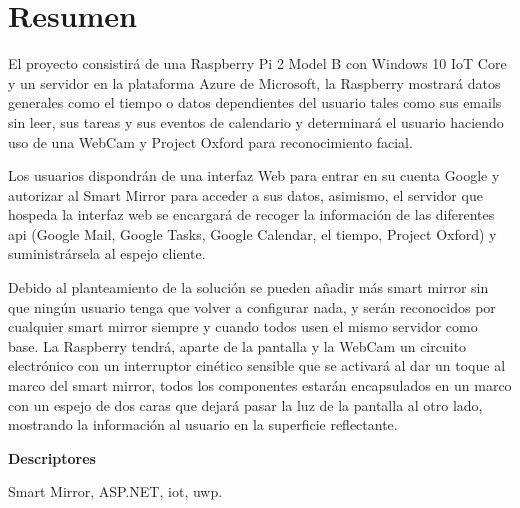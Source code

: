 \chapter*{Resumen}

El proyecto consistirá de una Raspberry Pi 2 Model B con Windows 10 IoT Core y un servidor en la plataforma Azure de Microsoft, la Raspberry mostrará datos generales como el tiempo o datos dependientes del usuario tales como sus emails sin leer, sus tareas y sus eventos de calendario y determinará el usuario haciendo uso de una WebCam y Project Oxford para reconocimiento facial.

Los usuarios dispondrán de una interfaz Web para entrar en su cuenta Google y autorizar al Smart Mirror para acceder a sus datos, asimismo, el servidor que hospeda la interfaz web se encargará de recoger la información de las diferentes \acrshort{api} (Google Mail, Google Tasks, Google Calendar, el tiempo, Project Oxford) y suministrársela al espejo cliente.

Debido al planteamiento de la solución se pueden añadir más smart mirror sin que ningún usuario tenga que volver a configurar nada, y serán reconocidos por cualquier smart mirror siempre y cuando todos usen el mismo servidor como base.
La Raspberry tendrá, aparte de la pantalla y la WebCam un circuito electrónico con un interruptor cinético sensible que se activará al dar un toque al marco del smart mirror, todos los componentes estarán encapsulados en un marco con un espejo de dos caras que dejará pasar la luz de la pantalla al otro lado, mostrando la información al usuario en la superficie reflectante.


\vspace{2em}

{\Large\bfseries\sffamily Descriptores}
\vspace{3\medskipamount}

Smart Mirror, ASP.NET, \acrshort{iot}, \acrshort{uwp}.